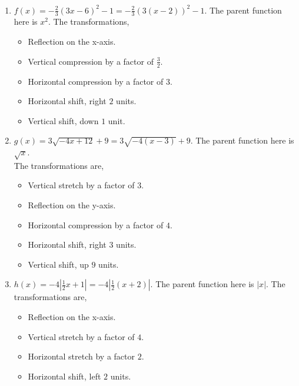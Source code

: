 \documentclass[12pt]{article} %
\theoremstyle{ex}
\begin{document}
\begin{qstn}
  \begin{solution} \texttt{ }
  \begin{enumerate}[label=(\alph*)]
    \item $f(x) = -\frac{2}{3}(3x-6)^2-1 = -\frac{2}{3}\left( 3(x-2) \right) ^2 - 1$. The parent function here is
      $x^2$. The transformations,
      \begin{itemize}
        \item Reflection on the x-axis.
        \item Vertical compression by a factor of $\frac{3}{2}$.
        \item Horizontal compression by a factor of $3$.
        \item Horizontal shift, right $2$ units.
        \item Vertical shift, down $1$ unit.
      \end{itemize}

    \item $g(x) = 3\sqrt{-4x+12} + 9 =  3\sqrt{-4(x-3)} + 9$. The parent function here is
      $\sqrt{x} $.\\ The transformations are,
      \begin{itemize}
        \item Vertical stretch by a factor of $3$.
        \item Reflection on the y-axis.
        \item Horizontal compression by a factor of $4$.
        \item Horizontal shift, right $3$ units.
        \item Vertical shift, up $9$ units.
      \end{itemize}

    \item $h(x) = -4\left|\frac{1}{2}x + 1\right| = -4\left|\frac{1}{2}(x + 2)\right|$. The parent function here is
      $\left|x\right|$. The transformations are,
      \begin{itemize}
        \item Reflection on the x-axis.
        \item Vertical stretch by a factor of $4$.
        \item Horizontal stretch by a factor $2$.
        \item Horizontal shift, left $2$ units.
      \end{itemize}
  \end{enumerate}
    
  \end{solution}
\end{qstn}
\end{document}
